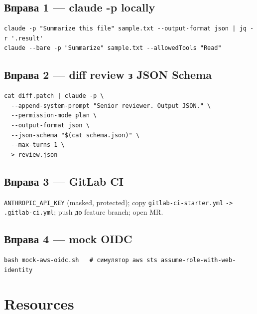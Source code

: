 \documentclass[11pt,a4paper]{article}
\begin{document}
\subsection{Вправа 1 --- claude -p locally}

\begin{lstlisting}
claude -p "Summarize this file" sample.txt --output-format json | jq -r '.result'
claude --bare -p "Summarize" sample.txt --allowedTools "Read"
\end{lstlisting}

\subsection{Вправа 2 --- diff review з JSON Schema}

\begin{lstlisting}
cat diff.patch | claude -p \
  --append-system-prompt "Senior reviewer. Output JSON." \
  --permission-mode plan \
  --output-format json \
  --json-schema "$(cat schema.json)" \
  --max-turns 1 \
  > review.json
\end{lstlisting}

\subsection{Вправа 3 --- GitLab CI}

\texttt{ANTHROPIC\_API\_KEY} (masked, protected); copy \texttt{gitlab-ci-starter.yml} \texttt{->} \texttt{.gitlab-ci.yml}; push до feature branch; open MR.

\subsection{Вправа 4 --- mock OIDC}

\begin{lstlisting}
bash mock-aws-oidc.sh   # симулятор aws sts assume-role-with-web-identity
\end{lstlisting}

\section{Resources}
\end{document}
